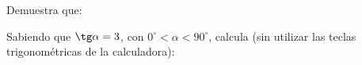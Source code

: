 \documentclass[addpoints,spanish, 12pt,a4paper]{exam}
\begin{document}
\begin{questions}
        \question Demuestra que:
        \begin{parts}
        \part[1] $\sec^2 \alpha + \cosec^2 \alpha = \sec^2 \alpha \cdot \cosec^2 \alpha$
        \end{parts}
        
        
        
        \question Sabiendo que $\tg \alpha = 3$, con $0^\circ < \alpha < 90^\circ$, calcula (sin utilizar las teclas trigonométricas de la calculadora):
        

\end{questions}
\end{document}
